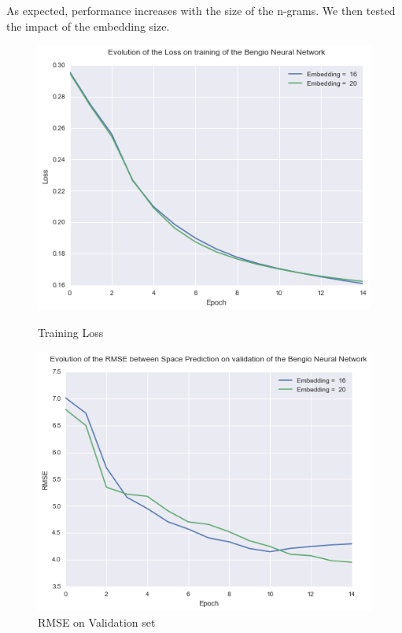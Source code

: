\documentclass[11pt]{article}
\begin{document}
As expected, performance increases with the size of the n-grams. We then tested the impact of the embedding size. 

\begin{figure}[H]
\centering
\begin{minipage}{.4\textwidth}
  \centering
  \includegraphics[width=1\linewidth]{train_nn_em}
  \caption{Training Loss}
\end{minipage}%
\begin{minipage}{.4\textwidth}
  \centering
  \includegraphics[width=1\linewidth]{rmse_em}
  \caption{RMSE on Validation set}
\end{minipage}
\end{figure}
\end{document}
